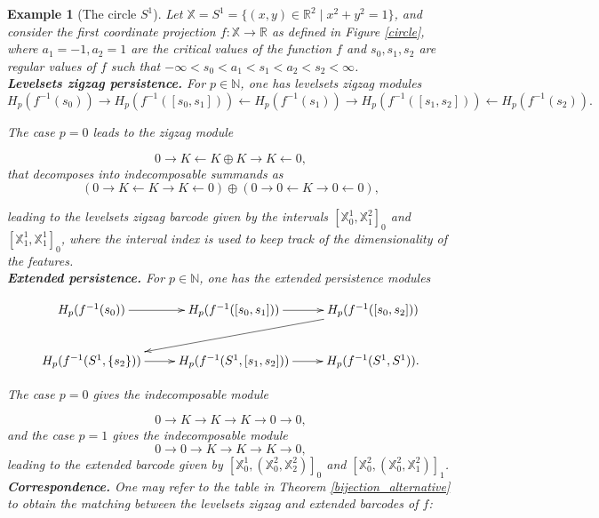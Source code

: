 \documentclass[11pt]{article}
\newtheorem{example}[theorem]{Example}
\theoremstyle{remark}
\newcommand{\N}{\mathbb{N}}
\newcommand{\R}{\mathbb{R}}
\newcommand{\X}{\mathbb{X}}
\begin{document}
\begin{example}[The circle $S^1$]
Let $\X=S^1 = \{(x,y) \in \R^2 \mid x^2 + y^2 = 1\}$, and consider the first coordinate projection $f:\X\rightarrow\R$ as defined in Figure \ref{circle}, where $a_1 = -1,a_2 =1$ are the critical values of the function $f$ and $s_0,s_1,s_2$ are regular values of $f$ such that $-\infty<s_0<a_1<s_1<a_2<s_2<\infty$.\\

\noindent \textbf{Levelsets zigzag persistence.} For $p\in\N$, one has levelsets zigzag modules
$$H_p(f^{-1}(s_0))\rightarrow H_p(f^{-1}([s_0,s_1]))\leftarrow   H_p(f^{-1}(s_1))\rightarrow H_p(f^{-1}([s_1,s_2]))\leftarrow H_p(f^{-1}(s_2)).$$

\noindent The case $p=0$ leads to the zigzag module 

$$0\rightarrow K\leftarrow K\oplus K\rightarrow K\leftarrow 0,$$ that decomposes into indecomposable summands as 
$$\left(0\rightarrow K\leftarrow K\rightarrow K\leftarrow 0\right)\oplus (0\rightarrow 0\leftarrow K\rightarrow 0\leftarrow 0),$$

\noindent leading to the levelsets zigzag barcode given by the intervals $[\X_0^1,\X_1^2]_0$ and $[\X_1^1,\X_1^1]_0$, where the interval index is used to keep track of the dimensionality of the features.\\

\noindent \textbf{Extended persistence.} For $p\in\N$, one has the extended persistence modules 


\[\xymatrix{
     H_p(f^{-1}(s_0)) \ar[r] & H_p(f^{-1}([s_0,s_1])) \ar[r] & H_p(f^{-1}([s_0,s_2])) \ar[dll]\\
              H_p(f^{-1}(S^1,\{s_2\})) \ar[r] & H_p(f^{-1}(S^1,[s_1,s_2])) \ar[r]& H_p(f^{-1}(S^1,S^1)).
    }\]

 

\noindent The case $p=0$ gives the indecomposable module 

$$0\rightarrow K\rightarrow K\rightarrow K\rightarrow 0\rightarrow 0,$$ and the case $p=1$ gives the indecomposable module
$$0\rightarrow 0\rightarrow K\rightarrow K\rightarrow K\rightarrow 0,$$
\noindent leading to the extended barcode given by $[\X_0^1,(\X_0^2,\X_2^2)]_0$ and $[\X_0^2,(\X_0^2,\X_1^2)]_1$.\\

\noindent \textbf{Correspondence.} One may refer to the table in Theorem \ref{bijection_alternative} to obtain the matching between the levelsets zigzag and extended barcodes of $f$:


\end{example}
\end{document}
